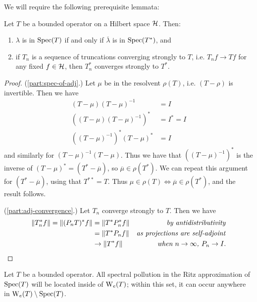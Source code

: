 \documentclass[../main.tex]{subfiles}
\begin{document}
We will require the following prerequisite lemmata:
\begin{lemma}\label{thm:adjoint-spec-props}
  Let $T$ be a bounded operator on a Hilbert space $\mathcal{H}$. Then:
  \begin{enumerate}
  \item
  \label{part:spec-of-adj}
    $\lambda$ is in $\mathrm{Spec}(T)$ if and only if $\overline{\lambda}$ is in $\mathrm{Spec}(T^*)$, and
  \item
  \label{part:adj-convergence}
    if $T_n$ is a sequence of truncations converging strongly to $T$, i.e. $T_n f
    \rightarrow Tf$ for any fixed $f \in \mathcal{H}$, then $T_n^*$ converges
    strongly to $T^*$.
  \end{enumerate}
\end{lemma}
\begin{proof}
(\ref{part:spec-of-adj}.) Let $\mu$ be in the resolvent $\rho(T)$,
i.e. $(T - \rho)$ is invertible. Then we have
\begin{align*}
(T - \mu)(T - \mu)^{-1} & = I \\
((T - \mu)(T - \mu)^{-1})^* & = I^* = I \\
((T - \mu)^{-1})^*(T - \mu)^* & = I
\end{align*}
and similarly for $(T - \mu)^{-1}(T - \mu)$. Thus we have that 
$((T - \mu)^{-1})^*$ is the inverse of $(T - \mu)^* = (T^* - \overline{\mu})$,
so $\overline{\mu} \in \rho(T^*)$. We can repeat this argument for 
$(T^* - \overline{\mu})$, using that $T^{**} = T$. Thus $\mu \in \rho(T)
\Leftrightarrow \overline{\mu} \in \rho(T^*)$, and the result follows.

(\ref{part:adj-convergence}.) Let $T_n$ converge strongly to $T$. Then we have
  \begin{align*}
    \|T_n^*f\| = \|(P_n T)^* f\| & = \|T^* P_n^* f\| & \text{\emph{by antidistributivity}} \\
    & = \|T^* P_n f\| & \text{\emph{as projections are self-adjoint}} \\
    & \rightarrow \|T^* f\| & \text{\emph{when $n \rightarrow \infty$, $P_n \rightarrow I$}}.
  \end{align*}
\end{proof}

\begin{theorem}
\label{thm:pokrzywa}
  Let $T$ be a bounded operator. All spectral pollution in the Ritz approximation
  of $\mathrm{Spec}(T)$ will be located inside of $\mathrm{W}_e(T)$; within this set, it can
  occur anywhere in $\mathrm{W}_e(T) \setminus \mathrm{Spec}(T)$.
\end{theorem}
\end{document}
